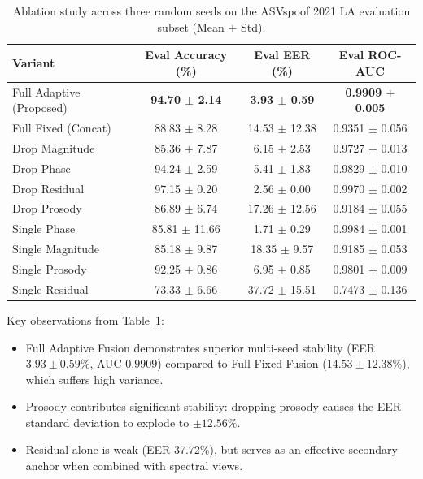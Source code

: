 \documentclass[conference]{IEEEtran}
\begin{document}
\begin{table}[t]
\caption{Ablation study across three random seeds on the ASVspoof 2021 LA evaluation subset (Mean $\pm$ Std).}
\label{tab:ablation}
\centering
\footnotesize
\setlength{\tabcolsep}{5pt}
\begin{tabular}{lccc}
\toprule
Variant & Eval Accuracy (\%) & Eval EER (\%) & Eval ROC-AUC \\
\midrule
Full Adaptive (Proposed) & \textbf{94.70 $\pm$ 2.14} & \textbf{3.93 $\pm$ 0.59} & \textbf{0.9909 $\pm$ 0.005} \\
Full Fixed (Concat)      & 88.83 $\pm$ 8.28 & 14.53 $\pm$ 12.38 & 0.9351 $\pm$ 0.056 \\
\midrule
Drop Magnitude           & 85.36 $\pm$ 7.87 & 6.15 $\pm$ 2.53  & 0.9727 $\pm$ 0.013 \\
Drop Phase               & 94.24 $\pm$ 2.59 & 5.41 $\pm$ 1.83  & 0.9829 $\pm$ 0.010 \\
Drop Residual            & 97.15 $\pm$ 0.20 & 2.56 $\pm$ 0.00  & 0.9970 $\pm$ 0.002 \\
Drop Prosody             & 86.89 $\pm$ 6.74 & 17.26 $\pm$ 12.56 & 0.9184 $\pm$ 0.055 \\
\midrule
Single Phase             & 85.81 $\pm$ 11.66 & 1.71 $\pm$ 0.29 & 0.9984 $\pm$ 0.001 \\
Single Magnitude         & 85.18 $\pm$ 9.87  & 18.35 $\pm$ 9.57 & 0.9185 $\pm$ 0.053 \\
Single Prosody           & 92.25 $\pm$ 0.86  & 6.95 $\pm$ 0.85  & 0.9801 $\pm$ 0.009 \\
Single Residual          & 73.33 $\pm$ 6.66  & 37.72 $\pm$ 15.51 & 0.7473 $\pm$ 0.136 \\
\bottomrule
\end{tabular}
\end{table}

Key observations from Table~\ref{tab:ablation}:
\begin{itemize}
    \item Full Adaptive Fusion demonstrates superior multi-seed stability (EER $3.93 \pm 0.59\%$, AUC $0.9909$) compared to Full Fixed Fusion ($14.53 \pm 12.38\%$), which suffers high variance.
    \item Prosody contributes significant stability: dropping prosody causes the EER standard deviation to explode to $\pm 12.56\%$.
    \item Residual alone is weak (EER 37.72\%), but serves as an effective secondary anchor when combined with spectral views.
\end{itemize}
\end{document}
